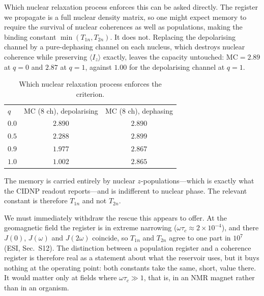 \documentclass[aps,prx,reprint,superscriptaddress,nofootinbib,floatfix]{revtex4-2}
\begin{document}
Which nuclear relaxation process enforces this can be asked directly. The
register we propagate is a full nuclear density matrix, so one might expect
memory to require the survival of nuclear coherences as well as populations,
making the binding constant $\min(T_{1n},T_{2n})$. It does not. Replacing the
depolarising channel by a pure-dephasing channel on each nucleus, which destroys
nuclear coherence while preserving $\langle I_z\rangle$ exactly, leaves the
capacity untouched: $\mathrm{MC}=2.89$ at $q=0$ and $2.87$ at $q=1$, against
$1.00$ for the depolarising channel at $q=1$.

\begin{table}[htbp]
\caption{\label{tab:chan_main}Which nuclear relaxation process enforces the criterion.}
\begin{ruledtabular}
\begin{tabular}{lcc}
$q$ & MC (8 ch), depolarising & MC (8 ch), dephasing \\
$0.0$ & $2.890$ & $2.890$ \\
$0.5$ & $2.288$ & $2.899$ \\
$0.9$ & $1.977$ & $2.867$ \\
$1.0$ & $1.002$ & $2.865$ \\
\end{tabular}
\end{ruledtabular}
\end{table}

The memory is carried entirely by nuclear $z$-populations---which is exactly what
the CIDNP readout reports---and is indifferent to nuclear phase. The relevant
constant is therefore $T_{1n}$ and not $T_{2n}$.

We must immediately withdraw the rescue this appears to offer. At the geomagnetic
field the register is in extreme narrowing ($\omega\tau_c\approx2\times10^{-4}$),
and there $J(0)$, $J(\omega)$ and $J(2\omega)$ coincide, so $T_{1n}$ and $T_{2n}$
agree to one part in $10^{7}$
(ESI, Sec.~S12). The distinction between a population register
and a coherence register is therefore real as a statement about what the
reservoir uses, but it buys nothing at the operating point: both constants take
the same, short, value there. It would matter only at fields where
$\omega\tau_c\gg1$, that is, in an NMR magnet rather than in an organism.
\end{document}
